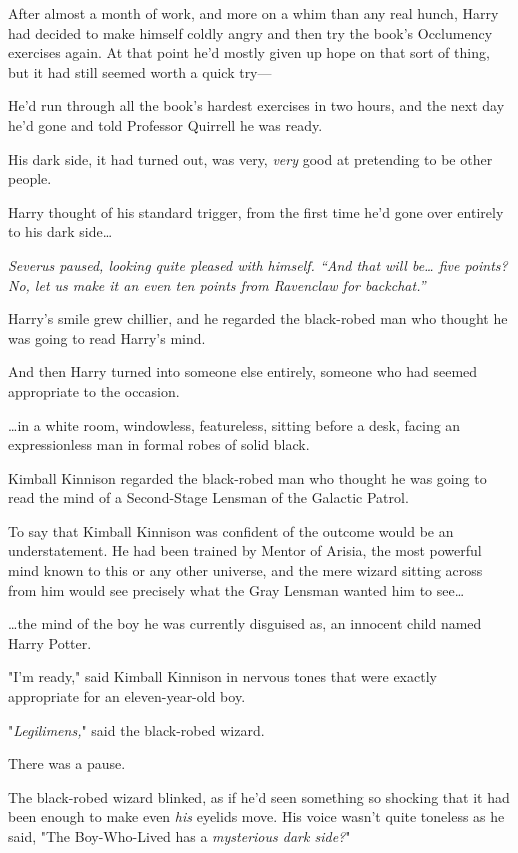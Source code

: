 After almost a month of work, and more on a whim than any real hunch, Harry had
decided to make himself coldly angry and then try the book's Occlumency
exercises again. At that point he'd mostly given up hope on that sort of thing,
but it had still seemed worth a quick try---

He'd run through all the book's hardest exercises in two hours, and the next
day he'd gone and told Professor Quirrell he was ready.

His dark side, it had turned out, was very, \emph{very} good at pretending to
be other people.

Harry thought of his standard trigger, from the first time he'd gone over
entirely to his dark side{\ldots}

\emph{Severus paused, looking quite pleased with himself. ``And that will
be{\ldots} five points? No, let us make it an even ten points from Ravenclaw
for backchat.''}

Harry's smile grew chillier, and he regarded the black-robed man who thought he
was going to read Harry's mind.

And then Harry turned into someone else entirely, someone who had seemed
appropriate to the occasion.

{\ldots}in a white room, windowless, featureless, sitting before a desk, facing
an expressionless man in formal robes of solid black.

Kimball Kinnison regarded the black-robed man who thought he was going to read
the mind of a Second-Stage Lensman of the Galactic Patrol.

To say that Kimball Kinnison was confident of the outcome would be an
understatement. He had been trained by Mentor of Arisia, the most powerful mind
known to this or any other universe, and the mere wizard sitting across from
him would see precisely what the Gray Lensman wanted him to see{\ldots}

{\ldots}the mind of the boy he was currently disguised as, an innocent child
named Harry Potter.

"I'm ready," said Kimball Kinnison in nervous tones that were exactly
appropriate for an eleven-year-old boy.

"\emph{Legilimens,}" said the black-robed wizard.

There was a pause.

The black-robed wizard blinked, as if he'd seen something so shocking that it
had been enough to make even \emph{his} eyelids move. His voice wasn't quite
toneless as he said, "The Boy-Who-Lived has a \emph{mysterious dark side?}"


